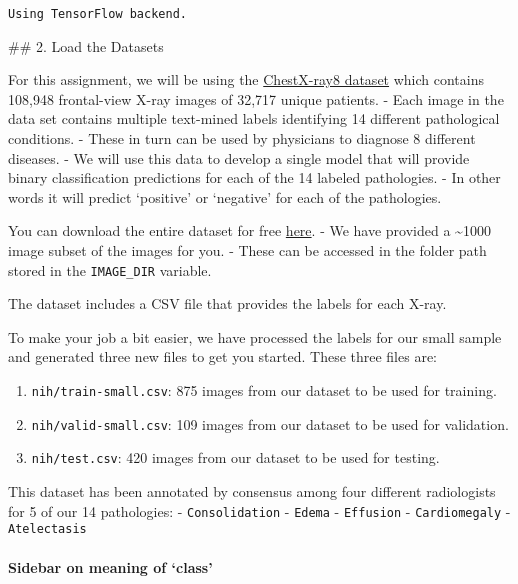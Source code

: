 \documentclass[11pt]{article}
\providecommand{\tightlist}{%
      \setlength{\itemsep}{0pt}\setlength{\parskip}{0pt}}
\begin{document}
    \begin{Verbatim}[commandchars=\\\{\}]
Using TensorFlow backend.

    \end{Verbatim}

     \#\# 2. Load the Datasets

For this assignment, we will be using the
\href{https://arxiv.org/abs/1705.02315}{ChestX-ray8 dataset} which
contains 108,948 frontal-view X-ray images of 32,717 unique patients. -
Each image in the data set contains multiple text-mined labels
identifying 14 different pathological conditions. - These in turn can be
used by physicians to diagnose 8 different diseases. - We will use this
data to develop a single model that will provide binary classification
predictions for each of the 14 labeled pathologies. - In other words it
will predict `positive' or `negative' for each of the pathologies.

You can download the entire dataset for free
\href{https://nihcc.app.box.com/v/ChestXray-NIHCC}{here}. - We have
provided a \textasciitilde{}1000 image subset of the images for you. -
These can be accessed in the folder path stored in the
\texttt{IMAGE\_DIR} variable.

The dataset includes a CSV file that provides the labels for each X-ray.

To make your job a bit easier, we have processed the labels for our
small sample and generated three new files to get you started. These
three files are:

\begin{enumerate}
\def\labelenumi{\arabic{enumi}.}
\tightlist
\item
  \texttt{nih/train-small.csv}: 875 images from our dataset to be used
  for training.
\item
  \texttt{nih/valid-small.csv}: 109 images from our dataset to be used
  for validation.
\item
  \texttt{nih/test.csv}: 420 images from our dataset to be used for
  testing.
\end{enumerate}

This dataset has been annotated by consensus among four different
radiologists for 5 of our 14 pathologies: - \texttt{Consolidation} -
\texttt{Edema} - \texttt{Effusion} - \texttt{Cardiomegaly} -
\texttt{Atelectasis}

    \hypertarget{sidebar-on-meaning-of-class}{%
\paragraph{Sidebar on meaning of
`class'}\label{sidebar-on-meaning-of-class}}
\end{document}
